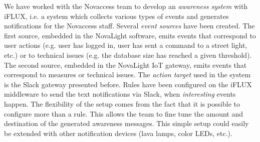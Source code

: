 
We have worked with the Novaccess team to develop an \emph{awareness system} with iFLUX, i.e. a system which collects various types of events and generates notifications for the Novaccess staff. Several \emph{event sources} have been created. The first source, embedded in the NovaLight software, emits events that correspond to user actions (e.g. user has logged in, user has sent a command to a street light, etc.) or to technical issues (e.g. the database size has reached a given threshold). The second source, embedded in the NovaLight IoT gateway, emits events that correspond to measures or technical issues. The \emph{action target} used in the system is the Slack gateway presented before. Rules have been configured on the iFLUX middleware to send the text notifications via Slack, when \emph{interesting} events happen. The flexibility of the setup comes from the fact that it is possible to configure more than a rule. This allows the team to fine tune the amount and destination of the generated awareness messages. This simple setup could easily be extended with other notification devices (lava lamps, color LEDs, etc.).


